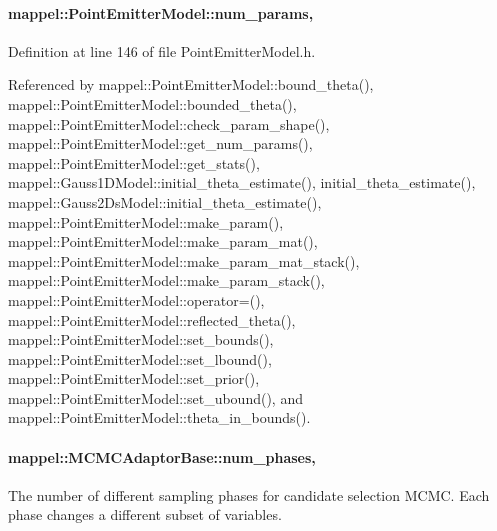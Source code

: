 \paragraph[{\texorpdfstring{num\+\_\+params}{num_params}}]{ mappel\+::\+Point\+Emitter\+Model\+::num\+\_\+params\hspace{0.3cm}{\ttfamily [protected]}, {\ttfamily [inherited]}}\hypertarget{classmappel_1_1PointEmitterModel_a9af0484391bd6021ddc04ac666ab49ad}{}\label{classmappel_1_1PointEmitterModel_a9af0484391bd6021ddc04ac666ab49ad}


Definition at line 146 of file Point\+Emitter\+Model.\+h.



Referenced by mappel\+::\+Point\+Emitter\+Model\+::bound\+\_\+theta(), mappel\+::\+Point\+Emitter\+Model\+::bounded\+\_\+theta(), mappel\+::\+Point\+Emitter\+Model\+::check\+\_\+param\+\_\+shape(), mappel\+::\+Point\+Emitter\+Model\+::get\+\_\+num\+\_\+params(), mappel\+::\+Point\+Emitter\+Model\+::get\+\_\+stats(), mappel\+::\+Gauss1\+D\+Model\+::initial\+\_\+theta\+\_\+estimate(), initial\+\_\+theta\+\_\+estimate(), mappel\+::\+Gauss2\+Ds\+Model\+::initial\+\_\+theta\+\_\+estimate(), mappel\+::\+Point\+Emitter\+Model\+::make\+\_\+param(), mappel\+::\+Point\+Emitter\+Model\+::make\+\_\+param\+\_\+mat(), mappel\+::\+Point\+Emitter\+Model\+::make\+\_\+param\+\_\+mat\+\_\+stack(), mappel\+::\+Point\+Emitter\+Model\+::make\+\_\+param\+\_\+stack(), mappel\+::\+Point\+Emitter\+Model\+::operator=(), mappel\+::\+Point\+Emitter\+Model\+::reflected\+\_\+theta(), mappel\+::\+Point\+Emitter\+Model\+::set\+\_\+bounds(), mappel\+::\+Point\+Emitter\+Model\+::set\+\_\+lbound(), mappel\+::\+Point\+Emitter\+Model\+::set\+\_\+prior(), mappel\+::\+Point\+Emitter\+Model\+::set\+\_\+ubound(), and mappel\+::\+Point\+Emitter\+Model\+::theta\+\_\+in\+\_\+bounds().

\paragraph[{\texorpdfstring{num\+\_\+phases}{num_phases}}]{ mappel\+::\+M\+C\+M\+C\+Adaptor\+Base\+::num\+\_\+phases\hspace{0.3cm}{\ttfamily [protected]}, {\ttfamily [inherited]}}\hypertarget{classmappel_1_1MCMCAdaptorBase_a44b90a984ace712584074dc17831fe25}{}\label{classmappel_1_1MCMCAdaptorBase_a44b90a984ace712584074dc17831fe25}
The number of different sampling phases for candidate selection M\+C\+MC. Each phase changes a different subset of variables. 

